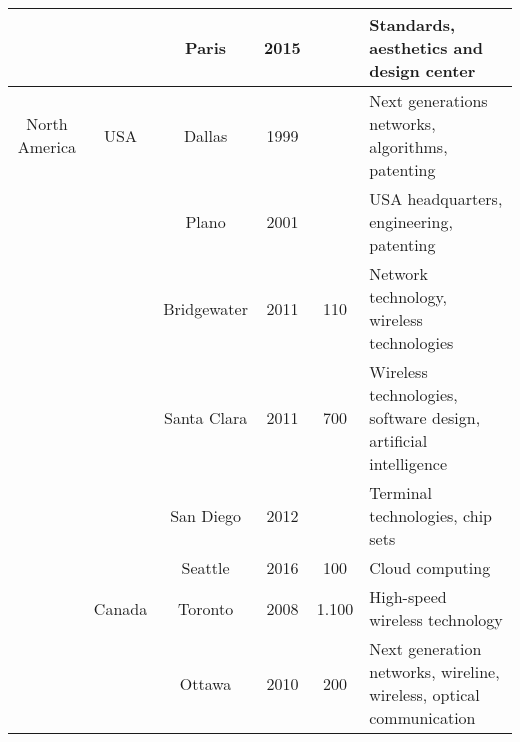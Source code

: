 \documentclass{book}
\begin{document}
\begin{sidewaystable}
\begin{tabularx}{1.0\textwidth}{cccccX}
				&			& Paris		& 2015			& 				& Standards, aesthetics and design center\\
				
		\hline
		

North America 	& USA		& Dallas	& 1999			&				& Next generations networks, algorithms, patenting \\

				&			& Plano		& 2001			& 				& USA headquarters, engineering, patenting \\
				
				&			& Bridgewater & 2011		& 110			& Network technology, wireless technologies \\
				
				&			& Santa Clara & 2011		& 700		& Wireless technologies, software design, artificial intelligence \\
				
				& 			& San Diego & 2012			&				& Terminal technologies, chip sets \\
				
				&			& Seattle	& 2016			& 100			& Cloud computing \\
				
				
		\cline{2-6}
		
		
				& Canada	& Toronto	& 2008			& 1.100			& High-speed wireless technology \\
				
				&			& Ottawa	& 2010			& 200			& Next generation networks, wireline, wireless, optical communication\\
				
				
		\cline{2-6}	
		
		
		\end{tabularx}
	
	\label{table:huawei_advanced}	
	
\end{sidewaystable} 
\end{document}
